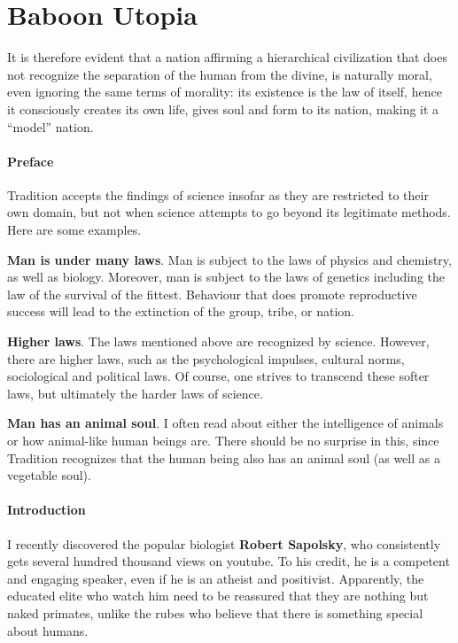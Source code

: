 \section{Baboon Utopia}

\begin{quotex}
It is therefore evident that a nation affirming a hierarchical civilization that does not recognize the separation of the human from the divine, is naturally moral, even ignoring the same terms of morality: its existence is the law of itself, hence it consciously creates its own life, gives soul and form to its nation, making it a ``model'' nation.
\end{quotex}


\paragraph{Preface}


Tradition accepts the findings of science insofar as they are restricted to their own domain, but not when science attempts to go beyond its legitimate methods. Here are some examples.

\textbf{Man is under many laws}. Man is subject to the laws of physics and chemistry, as well as biology. Moreover, man is subject to the laws of genetics including the law of the survival of the fittest. Behaviour that does promote reproductive success will lead to the extinction of the group, tribe, or nation.

\textbf{Higher laws}. The laws mentioned above are recognized by science. However, there are higher laws, such as the psychological impulses, cultural norms, sociological and political laws. Of course, one strives to transcend these softer laws, but ultimately the harder laws of science.

\textbf{Man has an animal soul}. I often read about either the intelligence of animals or how animal-like human beings are. There should be no surprise in this, since Tradition recognizes that the human being also has an animal soul (as well as a vegetable soul).

\paragraph{Introduction}


I recently discovered the popular biologist \textbf{Robert Sapolsky}, who consistently gets several hundred thousand views on youtube. To his credit, he is a competent and engaging speaker, even if he is an atheist and positivist. Apparently, the educated elite who watch him need to be reassured that they are nothing but naked primates, unlike the rubes who believe that there is something special about humans.

